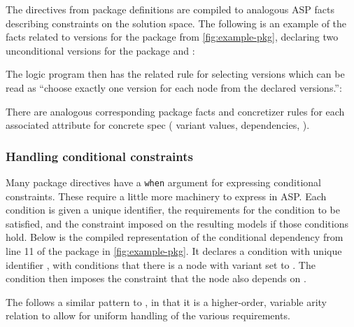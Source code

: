 The directives from package definitions are compiled to analogous ASP facts
describing constraints on the solution space. The following is an example of the
facts related to versions for the package from \cref{fig:example-pkg}, declaring
two unconditional versions for the package  and :
%
\par\vspace{0.8em}\noindent\colorbox{whitesmoke}{\begin{minipage}{0.98\columnwidth}\end{minipage}}\vspace{0.8em}
The logic program then has the related rule for selecting versions which can
be read as ``choose exactly one version for each node from the
declared versions.'':
\par\vspace{0.8em}\noindent\colorbox{whitesmoke}{\begin{minipage}{0.98\columnwidth}\end{minipage}}\vspace{0.8em}
There are analogous corresponding package facts and concretizer rules for each
associated attribute for concrete spec (\eg{} variant values, dependencies, \etc{}).

\subsubsection{Handling conditional constraints}
\label{sec:concretizer-imposition}
Many package directives have a \texttt{when} argument for expressing
conditional constraints. These require a little more machinery to express in
ASP. Each condition is given a unique identifier, the requirements
for the condition to be satisfied, and the constraint imposed on the resulting
models if those conditions hold. Below is the compiled representation of the
conditional dependency from line 11 of the package in \cref{fig:example-pkg}. It
declares a condition with unique identifier , with conditions that
there is a node  with variant  set
to . The condition then imposes the constraint that the 
node also depends on .
\par\vspace{0.8em}\noindent\colorbox{whitesmoke}{\begin{minipage}{0.98\columnwidth}\end{minipage}}\vspace{0.8em}
The  follows a similar pattern to , in
that it is a higher-order, variable arity relation to allow for uniform handling
of the various requirements.

